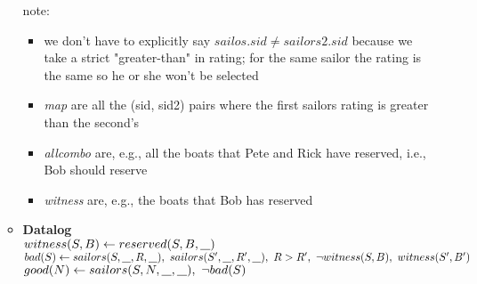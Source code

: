 \documentclass{article}
\newcommand{\anyvar}{\underline{\hspace{0.8em}}}
\newcommand{\DL}{\textbf{Datalog}}
\begin{document}
\begin{enumerate}
\begin{itemize}
	note:
	\begin{itemize}
		\item we don't have to explicitly say $sailos.sid \neq sailors2.sid$ because we take a strict "greater-than" in rating; for the same sailor the rating is the same so he or she won't be selected
		\item \textit{map} are all the (sid, sid2) pairs where the first sailors rating is greater than the second's
		\item \textit{allcombo} are, e.g., all the boats that Pete and Rick have reserved, i.e., Bob should reserve
		\item \textit{witness} are, e.g., the boats that Bob has reserved
	\end{itemize}
	\item \DL \\
	$ witness(S, B) \gets reserved(S, B, \anyvar) $ \\
	$ bad(S) \gets sailors(S, \anyvar, R, \anyvar),\ sailors(S', \anyvar, R', \anyvar),\ R > R',\ \neg witness(S, B),\  witness(S', B') $ \\
	$ good(N) \gets sailors(S, N, \anyvar, \anyvar), \ \neg bad(S)$
\end{itemize}

\end{enumerate}
\end{document}
